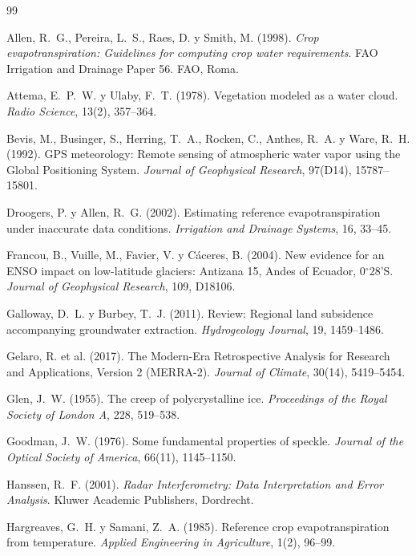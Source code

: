 \documentclass[11pt,a4paper]{article}
\begin{document}
\begin{thebibliography}{99}\small

 Allen, R.~G., Pereira, L.~S., Raes, D. y Smith, M. (1998). \emph{Crop
evapotranspiration: Guidelines for computing crop water requirements}. FAO Irrigation and Drainage Paper
56. FAO, Roma.

 Attema, E.~P.~W. y Ulaby, F.~T. (1978). Vegetation modeled as a water cloud.
\emph{Radio Science}, 13(2), 357--364.

 Bevis, M., Businger, S., Herring, T.~A., Rocken, C., Anthes, R.~A. y Ware, R.~H.
(1992). GPS meteorology: Remote sensing of atmospheric water vapor using the Global Positioning System.
\emph{Journal of Geophysical Research}, 97(D14), 15787--15801.

 Droogers, P. y Allen, R.~G. (2002). Estimating reference evapotranspiration under
inaccurate data conditions. \emph{Irrigation and Drainage Systems}, 16, 33--45.

 Francou, B., Vuille, M., Favier, V. y Cáceres, B. (2004). New evidence for an ENSO
impact on low-latitude glaciers: Antizana 15, Andes of Ecuador, 0$^\circ$28'S. \emph{Journal of
Geophysical Research}, 109, D18106.

 Galloway, D.~L. y Burbey, T.~J. (2011). Review: Regional land subsidence
accompanying groundwater extraction. \emph{Hydrogeology Journal}, 19, 1459--1486.

 Gelaro, R. et al. (2017). The Modern-Era Retrospective Analysis for Research and
Applications, Version 2 (MERRA-2). \emph{Journal of Climate}, 30(14), 5419--5454.

 Glen, J.~W. (1955). The creep of polycrystalline ice. \emph{Proceedings of the Royal
Society of London A}, 228, 519--538.

 Goodman, J.~W. (1976). Some fundamental properties of speckle. \emph{Journal of the
Optical Society of America}, 66(11), 1145--1150.

 Hanssen, R.~F. (2001). \emph{Radar Interferometry: Data Interpretation and Error
Analysis}. Kluwer Academic Publishers, Dordrecht.

 Hargreaves, G.~H. y Samani, Z.~A. (1985). Reference crop evapotranspiration from
temperature. \emph{Applied Engineering in Agriculture}, 1(2), 96--99.


\end{thebibliography}
\end{document}
